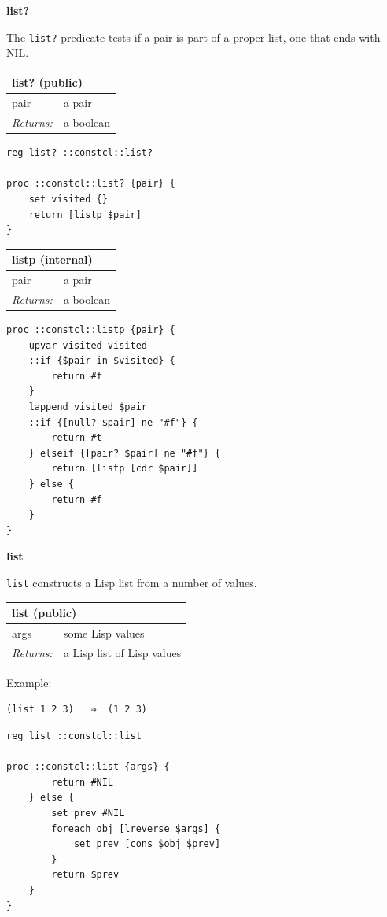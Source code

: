 \documentclass[twoside,9pt]{report}
\begin{document}
\textbf{list?}


The \texttt{list?} predicate tests if a pair is part of a proper list, one that ends with NIL.

\begin{tabular}{ |l l| }
\hline
\multicolumn{2}{|l|}{list? (public)} \\
\hline
pair & a pair \\
\textit{Returns:} & a boolean \\
\hline
\end{tabular}

\noindent\makebox[\linewidth]{\rule{\linewidth}{0.4pt}}
\begin{lstlisting}
reg list? ::constcl::list?
 
proc ::constcl::list? {pair} {
    set visited {}
    return [listp $pair]
}
\end{lstlisting}
\noindent\makebox[\linewidth]{\rule{\linewidth}{0.4pt}}
\begin{tabular}{ |l l| }
\hline
\multicolumn{2}{|l|}{listp (internal)} \\
\hline
pair & a pair \\
\textit{Returns:} & a boolean \\
\hline
\end{tabular}

\noindent\makebox[\linewidth]{\rule{\linewidth}{0.4pt}}
\begin{lstlisting}
proc ::constcl::listp {pair} {
    upvar visited visited
    ::if {$pair in $visited} {
        return #f
    }
    lappend visited $pair
    ::if {[null? $pair] ne "#f"} {
        return #t
    } elseif {[pair? $pair] ne "#f"} {
        return [listp [cdr $pair]]
    } else {
        return #f
    }
}
\end{lstlisting}
\noindent\makebox[\linewidth]{\rule{\linewidth}{0.4pt}}

\textbf{list}


\texttt{list} constructs a Lisp list from a number of values.

\begin{tabular}{ |l l| }
\hline
\multicolumn{2}{|l|}{list (public)} \\
\hline
args & some Lisp values \\
\textit{Returns:} & a Lisp list of Lisp values \\
\hline
\end{tabular}


Example:

\noindent\makebox[\linewidth]{\rule{\linewidth}{0.4pt}}
\begin{lstlisting}
(list 1 2 3)   ⇒  (1 2 3)
\end{lstlisting}
\noindent\makebox[\linewidth]{\rule{\linewidth}{0.4pt}}
\noindent\makebox[\linewidth]{\rule{\linewidth}{0.4pt}}
\begin{lstlisting}
reg list ::constcl::list
 
proc ::constcl::list {args} {
        return #NIL
    } else {
        set prev #NIL
        foreach obj [lreverse $args] {
            set prev [cons $obj $prev]
        }
        return $prev
    }
}
\end{lstlisting}
\noindent\makebox[\linewidth]{\rule{\linewidth}{0.4pt}}
\end{document}
